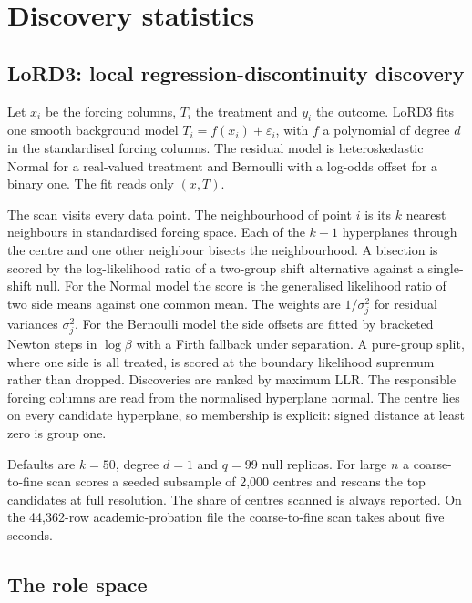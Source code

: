 \documentclass[11pt]{article}
\begin{document}
\section{Discovery statistics}\label{sec:discovery}

\subsection{LoRD3: local regression-discontinuity discovery}\label{sec:lord3}

Let $x_i$ be the forcing columns, $T_i$ the treatment and $y_i$ the outcome. LoRD3 fits
one smooth background model $T_i = f(x_i) + \varepsilon_i$, with $f$ a polynomial of
degree $d$ in the standardised forcing columns. The residual model is heteroskedastic
Normal for a real-valued treatment and Bernoulli with a log-odds offset for a binary
one. The fit reads only $(x, T)$.

The scan visits every data point. The neighbourhood of point $i$ is its $k$ nearest
neighbours in standardised forcing space. Each of the $k-1$ hyperplanes through the
centre and one other neighbour bisects the neighbourhood. A bisection is scored by the
log-likelihood ratio of a two-group shift alternative against a single-shift null. For the Normal model the score is the generalised likelihood ratio of two side means
against one common mean. The weights are $1/\sigma_j^2$ for residual variances
$\sigma_j^2$.
For the Bernoulli model the side offsets are fitted by bracketed Newton steps in
$\log\beta$ with a Firth fallback under separation. A pure-group split, where one side
is all treated, is scored at the boundary likelihood supremum rather than dropped.
Discoveries are ranked by maximum LLR. The responsible forcing columns are read from the
normalised hyperplane normal. The centre lies on every candidate hyperplane, so
membership is explicit: signed distance at least zero is group one.

Defaults are $k=50$, degree $d=1$ and $q=99$ null replicas. For large $n$ a coarse-to-fine
scan scores a seeded subsample of 2{,}000 centres and rescans the top candidates at full
resolution. The share of centres scanned is always reported. On the 44{,}362-row
academic-probation file the coarse-to-fine scan takes about five seconds.

\subsection{The role space}\label{sec:rolespace}
\end{document}
